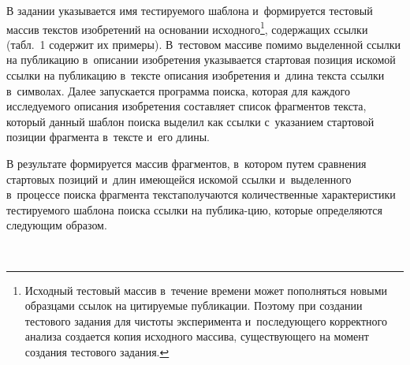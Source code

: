 \begin{multicols}{2}
  В задании указывается имя тестируемого шаблона и~формируется тестовый массив
текстов изобре\-те\-ний на основании исходного\footnote{Исходный тестовый массив в~течение
времени может пополняться новыми образцами ссылок на цитируемые публикации. Поэтому
при создании тестового задания для чистоты эксперимента и~последующего корректного
анализа создается копия исходного массива, существующего на момент создания тестового
задания.}, содержащих ссылки (табл.~1 содержит их примеры).
В~тес\-то\-вом массиве помимо
выделенной ссылки на пуб\-ли\-ка\-цию в~описании изобретения указывается стартовая позиция
искомой ссылки на пуб\-ли\-ка\-цию в~текс\-те описания изобре\-те\-ния и~длина
текс\-та ссылки в~символах. Далее запускается программа поиска, которая для
каждого исследуемого описания
изобре\-те\-ния составляет список фрагментов текс\-та, который данный шаблон поиска выделил
как ссылки с~указанием стартовой позиции фрагмента в~текс\-те и~его длины.



  В результате формируется массив фрагментов, в~котором путем сравнения стартовых
позиций и~длин имеющейся искомой ссылки и~выделенного в~процессе поиска фрагмента
текста\linebreak получаются количественные характеристики тес\-ти\-ру\-емо\-го
 шаблона поиска ссылки на
публика-цию, которые
 определяются следующим образом.\linebreak\vspace*{-12pt}

 \pagebreak


\end{multicols}

\begin{figure} %
 \vspace*{1pt}
 \begin{center}
 \mbox{%
 \epsfxsize=160mm
 }
\end{center}
 \vspace*{-9pt}
\vspace*{6pt}
\end{figure}

